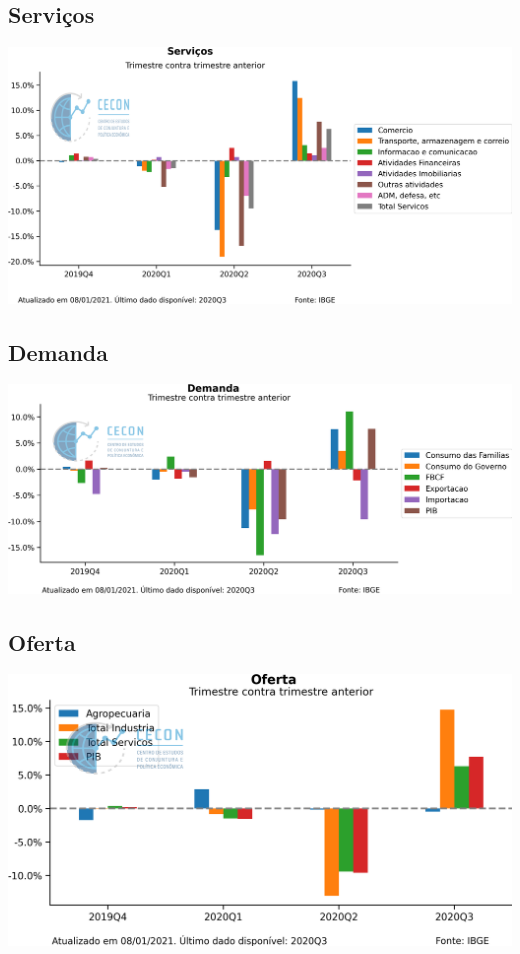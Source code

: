\documentclass{SelfArx}
\begin{document}
\subsection*{Serviços}
\label{sec:org7522573}

\begin{center}
\includegraphics[width=.9\linewidth]{./figs/PIB/Servicos.png}
\end{center}

\subsection*{Demanda}
\label{sec:orgc70aed5}

\begin{center}
\includegraphics[width=.9\linewidth]{./figs/PIB/Demanda.png}
\end{center}

\subsection*{Oferta}
\label{sec:org059bd9e}


\begin{center}
\includegraphics[width=.9\linewidth]{./figs/PIB/Oferta.png}
\end{center}
\end{document}
